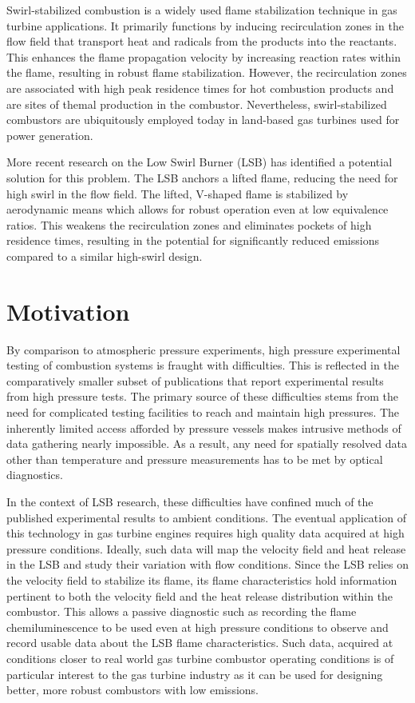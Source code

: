 Swirl-stabilized combustion is a widely used flame stabilization technique in gas turbine applications.\cite{1974-syred,1977-lilley}
It primarily functions by inducing recirculation zones in the flow field that transport heat and radicals from the products into the reactants.
This enhances the flame propagation velocity by increasing reaction rates within the flame, resulting in robust flame stabilization.
However, the recirculation zones are associated with high peak residence times for hot combustion products and are sites of themal  production in the combustor.
Nevertheless, swirl-stabilized combustors are ubiquitously employed today in land-based gas turbines used for power generation.

More recent research\cite{1995-bedat} on the Low Swirl Burner (LSB) has identified a potential solution for this problem.
The LSB anchors a lifted flame, reducing the need for high swirl in the flow field.
The lifted, V-shaped flame is stabilized by aerodynamic means which allows for robust operation even at low equivalence ratios.
This weakens the recirculation zones and eliminates pockets of high residence times, resulting in the potential for significantly reduced  emissions compared to a similar high-swirl design.

\section{Motivation}

By comparison to atmospheric pressure experiments, high pressure experimental testing of combustion systems is fraught with difficulties.
This is reflected in the comparatively smaller subset of publications that report experimental results from high pressure tests.
The primary source of these difficulties stems from the need for complicated testing facilities to reach and maintain high pressures.
The inherently limited access afforded by pressure vessels makes intrusive methods of data gathering nearly impossible.
As a result, any need for spatially resolved data other than temperature and pressure measurements has to be met by optical diagnostics.

In the context of LSB research, these difficulties have confined much of the published experimental results to ambient conditions.
The eventual application of this technology in gas turbine engines requires high quality data acquired at high pressure conditions.
Ideally, such data will map the velocity field and heat release in the LSB and study their variation with flow conditions.
Since the LSB relies on the velocity field to stabilize its flame, its flame characteristics hold information pertinent to both the velocity field and the heat release distribution within the combustor.
This allows a passive diagnostic such as recording the flame chemiluminescence to be used even at high pressure conditions to observe and record usable data about the LSB flame characteristics.
Such data, acquired at conditions closer to real world gas turbine combustor operating conditions is of particular interest to the gas turbine industry as it can be used for designing better, more robust combustors with low  emissions.

